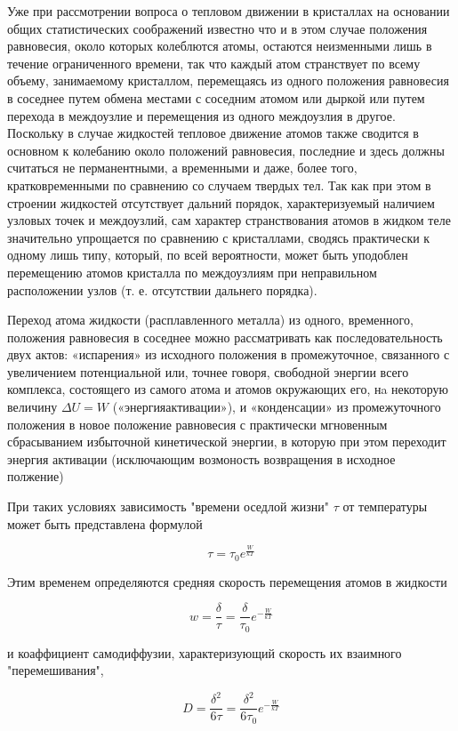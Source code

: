 \documentclass[a4paper, 12pt]{article}
\begin{document}
Уже при рассмотрении вопроса о тепловом движении в кристаллах на основании общих статистических соображений известно
что и в этом случае положения равновесия, около которых колеблются атомы, остаются неизменными лишь в течение ограниченного времени, так что 
каждый атом странствует по всему объему, занимаемому кристаллом, перемещаясь из одного положения равновесия в соседнее путем обмена местами с соседним 
атомом или дыркой или путем перехода в междоузлие и перемещения из одного междоузлия в другое.
Поскольку в случае жидкостей тепловое движение атомов также сводится в основном к колебанию около положений равновесия, последние и здесь должны 
считаться не перманентными, а временными и даже, более того, кратковременными по сравнению со случаем твердых тел. Так как при этом в строении жидкостей 
отсутствует дальний порядок, характеризуемый наличием узловых точек и междоузлий, сам характер странствования атомов в жидком теле
значительно упрощается по сравнению с кристаллами, сводясь практически к одному лишь типу, который, по всей вероятности,
может быть уподоблен перемещению атомов кристалла по междоузлиям при неправильном расположении узлов (т. е. отсутствии дальнего порядка).
 

Переход атома жидкости (расплавленного металла) из одного, временного, положения равновесия в соседнее можно рассматривать
как последовательность двух актов: «испарения» из исходного положения в промежуточное, связанного с увеличением потенциальной
или, точнее говоря, свободной энергии всего комплекса, состоящего из самого атома и атомов окружающих его,
нa некоторую величину $\Delta U = W$  («энергияактивации»), и «конденсации» из промежуточного положения в новое
положение равновесия с практически мгновенным сбрасыванием избыточной кинетической
энергии, в которую при этом переходит энергия активации (исключающим возмоность возвращения в исходное полжение)

При таких условиях зависимость "времени оседлой жизни"  $\tau$ от температуры может быть представлена формулой

\[ \tau = \tau_0 e^{\frac{W}{kT}} \]

Этим временем определяются средняя скорость перемещения атомов в жидкости

\[ w = \frac{\delta}{\tau} = \frac{\delta}{\tau_0}e^{-\frac{W}{kT}}\]

и коаффициент самодиффузии, характеризующий скорость их взаимного "перемешивания",

\[ D = \frac{\delta^2}{6\tau} = \frac{\delta^2}{6\tau_0}e^{-\frac{W}{kT}}\]
\end{document}
